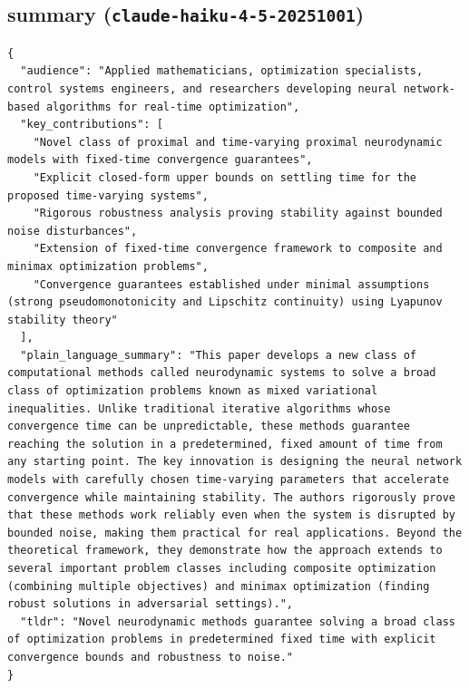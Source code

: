 \documentclass[11pt]{article}
\begin{document}
\subsection*{summary (\texttt{claude-haiku-4-5-20251001})}
\begin{verbatim}
{
  "audience": "Applied mathematicians, optimization specialists, control systems engineers, and researchers developing neural network-based algorithms for real-time optimization",
  "key_contributions": [
    "Novel class of proximal and time-varying proximal neurodynamic models with fixed-time convergence guarantees",
    "Explicit closed-form upper bounds on settling time for the proposed time-varying systems",
    "Rigorous robustness analysis proving stability against bounded noise disturbances",
    "Extension of fixed-time convergence framework to composite and minimax optimization problems",
    "Convergence guarantees established under minimal assumptions (strong pseudomonotonicity and Lipschitz continuity) using Lyapunov stability theory"
  ],
  "plain_language_summary": "This paper develops a new class of computational methods called neurodynamic systems to solve a broad class of optimization problems known as mixed variational inequalities. Unlike traditional iterative algorithms whose convergence time can be unpredictable, these methods guarantee reaching the solution in a predetermined, fixed amount of time from any starting point. The key innovation is designing the neural network models with carefully chosen time-varying parameters that accelerate convergence while maintaining stability. The authors rigorously prove that these methods work reliably even when the system is disrupted by bounded noise, making them practical for real applications. Beyond the theoretical framework, they demonstrate how the approach extends to several important problem classes including composite optimization (combining multiple objectives) and minimax optimization (finding robust solutions in adversarial settings).",
  "tldr": "Novel neurodynamic methods guarantee solving a broad class of optimization problems in predetermined fixed time with explicit convergence bounds and robustness to noise."
}
\end{verbatim}
\end{document}
